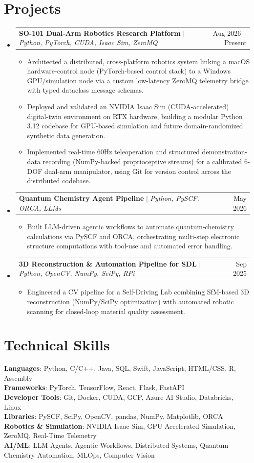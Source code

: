 \documentclass[letterpaper,11pt]{article}
\makeatletter
\newcommand{\resumeItem}[1]{
  \item\small{
    {#1 \vspace{-2.2pt}}
  }
}
\newcommand{\resumeProjectHeading}[2]{
    \item
    \begin{tabular*}{0.97\textwidth}{l@{\extracolsep{\fill}}r}
      \small#1 & #2 \\
    \end{tabular*}\vspace{-7pt}
}
\newcommand{\resumeSubHeadingListStart}{\begin{itemize}[leftmargin=0.15in, label={}]}
\newcommand{\resumeSubHeadingListEnd}{\end{itemize}}
\newcommand{\resumeItemListStart}{\begin{itemize}}
\newcommand{\resumeItemListEnd}{\end{itemize}\vspace{-5pt}}
\makeatother
\begin{document}
\section{Projects}
    \resumeSubHeadingListStart
      \resumeProjectHeading
        {\textbf{SO-101 Dual-Arm Robotics Research Platform} $|$ \emph{Python, PyTorch, CUDA, Isaac Sim, ZeroMQ}}{Aug 2026 -- Present}
        \resumeItemListStart
          \resumeItem{Architected a distributed, cross-platform robotics system linking a macOS hardware-control node (PyTorch-based control stack) to a Windows GPU/simulation node via a custom low-latency ZeroMQ telemetry bridge with typed dataclass message schemas.}
          \resumeItem{Deployed and validated an NVIDIA Isaac Sim (CUDA-accelerated) digital-twin environment on RTX hardware, building a modular Python 3.12 codebase for GPU-based simulation and future domain-randomized synthetic data generation.}
          \resumeItem{Implemented real-time 60Hz teleoperation and structured demonstration-data recording (NumPy-backed proprioceptive streams) for a calibrated 6-DOF dual-arm manipulator, using Git for version control across the distributed codebase.}
        \resumeItemListEnd
      \resumeProjectHeading
        {\textbf{Quantum Chemistry Agent Pipeline} $|$ \emph{Python, PySCF, ORCA, LLMs}}{May 2026}
        \resumeItemListStart
          \resumeItem{Built LLM-driven agentic workflows to automate quantum-chemistry calculations via PySCF and ORCA, orchestrating multi-step electronic structure computations with tool-use and automated error handling.}
        \resumeItemListEnd
      \resumeProjectHeading
        {\textbf{3D Reconstruction \& Automation Pipeline for SDL} $|$ \emph{Python, OpenCV, NumPy, SciPy, RPi}}{Sep 2025}
        \resumeItemListStart
          \resumeItem{Engineered a CV pipeline for a Self-Driving Lab combining SfM-based 3D reconstruction (NumPy/SciPy optimization) with automated robotic scanning for closed-loop material quality assessment.}
        \resumeItemListEnd
    \resumeSubHeadingListEnd

\section{Technical Skills}
 \begin{itemize}[leftmargin=0.15in, label={}]
    \small{\item{
     \textbf{Languages}{: Python, C/C++, Java, SQL, Swift, JavaScript, HTML/CSS, R, Assembly} \\
     \textbf{Frameworks}{: PyTorch, TensorFlow, React, Flask, FastAPI} \\
     \textbf{Developer Tools}{: Git, Docker, CUDA, GCP, Azure AI Studio, Databricks, Linux} \\
     \textbf{Libraries}{: PySCF, SciPy, OpenCV, pandas, NumPy, Matplotlib, ORCA} \\
     \textbf{Robotics \& Simulation}{: NVIDIA Isaac Sim, GPU-Accelerated Simulation, ZeroMQ, Real-Time Telemetry} \\
     \textbf{AI/ML}{: LLM Agents, Agentic Workflows, Distributed Systems, Quantum Chemistry Automation, MLOps, Computer Vision}
    }}
 \end{itemize}
\end{document}
